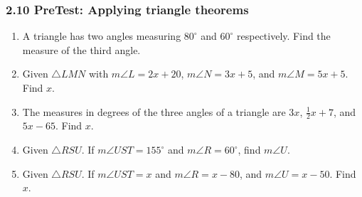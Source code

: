 \documentclass[12pt, twoside]{article}
\begin{document}
\subsubsection*{2.10 PreTest: Applying triangle theorems}
\begin{enumerate}[itemsep=0.5cm]

\item A triangle has two angles measuring $80^\circ$ and $60^\circ$ respectively. Find the measure of the third angle. \vspace{2cm}

\item Given  $\triangle LMN$ with $m\angle L=2x+20$, $m\angle N=3x+5$, and $m\angle M=5x+5$. Find $x$.
  \begin{flushright}
  \end{flushright} \vspace{2cm}

\item The measures in degrees of the three angles of a triangle are $3x$, $\frac{1}{2}x+7$, and $5x-65$. Find $x$. \vspace{4cm}

\item Given $\triangle RSU$. If $m\angle UST=155^\circ$ and $m\angle R=60^\circ$, find $m\angle U$.
  \begin{flushright}
  \end{flushright} \vspace{2cm}

\newpage
\item Given $\triangle RSU$. If $m\angle UST=x$ and $m\angle R=x-80$, and $m\angle U=x-50$. Find $x$.
  \begin{flushright}
  \end{flushright} \vspace{4cm}


\end{enumerate}
\end{document}
